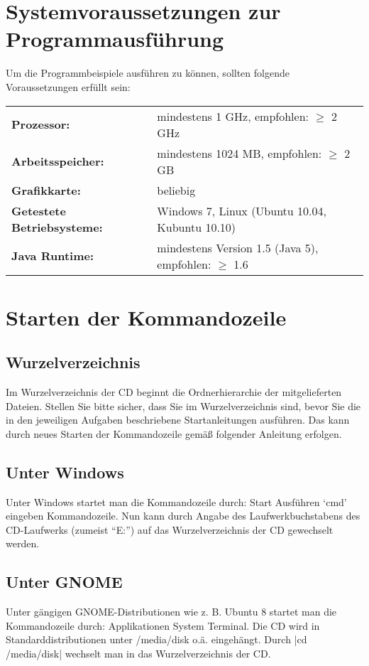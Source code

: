 \documentclass[a4paper,10pt,notitlepage]{scrreprt}
\begin{document}
\section{Systemvoraussetzungen zur Programmausführung}
\label{Vor}
Um die Programmbeispiele ausführen zu können, sollten folgende Voraussetzungen erfüllt sein:

 \begin{tabular}{ll}
  \textbf{Prozessor:}                & mindestens 1 GHz, empfohlen: $\geq$ 2 GHz \\
  \textbf{Arbeitsspeicher:}          & mindestens 1024 MB, empfohlen: $\geq$ 2 GB \\
  \textbf{Grafikkarte:}              & beliebig \\
  \textbf{Getestete Betriebsysteme:} & Windows 7, Linux (Ubuntu 10.04, Kubuntu 10.10) \\
  \textbf{Java Runtime:}             & mindestens Version 1.5 (Java 5), empfohlen: $\geq$ 1.6 \\
 \end{tabular}
\section{Starten der Kommandozeile}
\subsection{Wurzelverzeichnis}
 Im Wurzelverzeichnis der CD beginnt die Ordnerhierarchie der mitgelieferten Dateien.
 Stellen Sie bitte sicher, dass Sie im Wurzelverzeichnis sind, bevor Sie die in den jeweiligen Aufgaben beschriebene Startanleitungen ausführen.
 Das kann durch neues Starten der Kommandozeile gemäß folgender Anleitung erfolgen.
\newcommand{\then}{\textrightarrow{} }
\subsection{Unter Windows}
 Unter Windows startet man die Kommandozeile durch: Start \then Ausführen \then `cmd' eingeben \then Kommandozeile.
 Nun kann durch Angabe des Laufwerkbuchstabens des CD-Laufwerks (zumeist ``E:'') auf das Wurzelverzeichnis der CD gewechselt werden.
\subsection{Unter GNOME}
 Unter gängigen GNOME-Distributionen wie z. B. Ubuntu 8 startet man die Kommandozeile durch:
 Applikationen \then System \then Terminal.
 Die CD wird in Standarddistributionen unter /media/disk o.ä. eingehängt. Durch |cd /media/disk| wechselt man in das Wurzelverzeichnis der CD.
\end{document}
